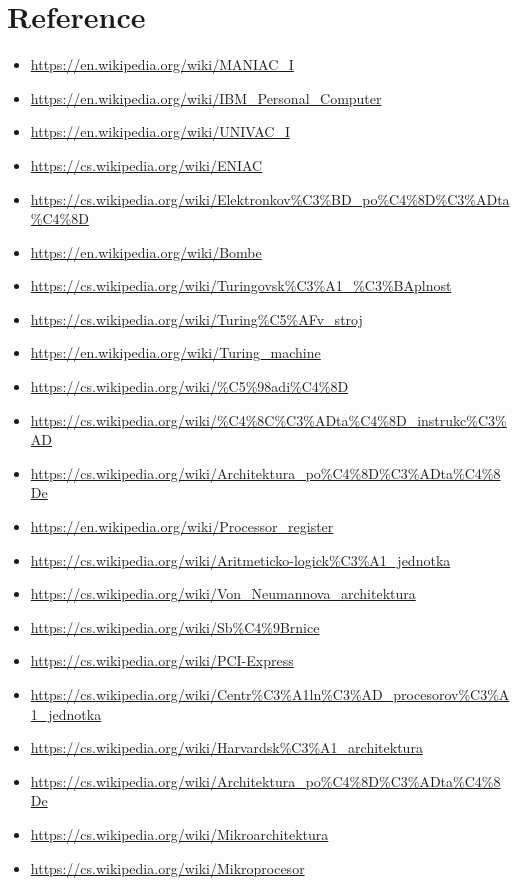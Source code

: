 \documentclass[a4paper]{article}
\begin{document}
\section{Reference}
    \begin{itemize}
        \item \url{https://en.wikipedia.org/wiki/MANIAC_I}
        \item \url{https://en.wikipedia.org/wiki/IBM_Personal_Computer}
        \item \url{https://en.wikipedia.org/wiki/UNIVAC_I}
        \item \url{https://cs.wikipedia.org/wiki/ENIAC}
        \item \url{https://cs.wikipedia.org/wiki/Elektronkov%C3%BD_po%C4%8D%C3%ADta%C4%8D}
        \item \url{https://en.wikipedia.org/wiki/Bombe}
        \item \url{https://cs.wikipedia.org/wiki/Turingovsk%C3%A1_%C3%BAplnost}
        \item \url{https://cs.wikipedia.org/wiki/Turing%C5%AFv_stroj}
        \item \url{https://en.wikipedia.org/wiki/Turing_machine}
        \item \url{https://cs.wikipedia.org/wiki/%C5%98adi%C4%8D}
        \item \url{https://cs.wikipedia.org/wiki/%C4%8C%C3%ADta%C4%8D_instrukc%C3%AD}
        \item \url{https://cs.wikipedia.org/wiki/Architektura_po%C4%8D%C3%ADta%C4%8De}
        \item \url{https://en.wikipedia.org/wiki/Processor_register}
        \item \url{https://cs.wikipedia.org/wiki/Aritmeticko-logick%C3%A1_jednotka}
        \item \url{https://cs.wikipedia.org/wiki/Von_Neumannova_architektura}
        \item \url{https://cs.wikipedia.org/wiki/Sb%C4%9Brnice}
        \item \url{https://cs.wikipedia.org/wiki/PCI-Express}
        \item \url{https://cs.wikipedia.org/wiki/Centr%C3%A1ln%C3%AD_procesorov%C3%A1_jednotka}
        \item \url{https://cs.wikipedia.org/wiki/Harvardsk%C3%A1_architektura}
        \item \url{https://cs.wikipedia.org/wiki/Architektura_po%C4%8D%C3%ADta%C4%8De}
        \item \url{https://cs.wikipedia.org/wiki/Mikroarchitektura}
        \item \url{https://cs.wikipedia.org/wiki/Mikroprocesor}
    \end{itemize}
\end{document}
